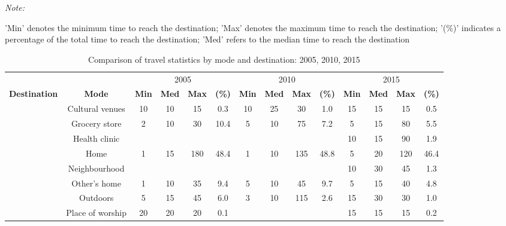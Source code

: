\documentclass[Royal,times,sageh]{sagej}
\begin{document}
\begingroup\fontsize{6}{8}\selectfont

\begin{ThreePartTable}
\begin{TableNotes}
\item \textit{Note: } 
\item 'Min' denotes the minimum time to reach the destination; 'Max' denotes the maximum time to reach the destination; '(\%)' indicates a percentage of the total time to reach the destination; 'Med' refers to the median time to reach the destination
\end{TableNotes}
\begin{longtable}[t]{ccccc>{}c|ccc>{}c|cccc}
\caption{\label{tab:table-03}\label{tab:table-03}Comparison of travel statistics by mode and destination: 2005, 2010, 2015}\\
\toprule
\multicolumn{2}{c}{ } & \multicolumn{4}{c}{2005} & \multicolumn{4}{c}{2010} & \multicolumn{4}{c}{2015} \\
\cmidrule(l{3pt}r{3pt}){3-6} \cmidrule(l{3pt}r{3pt}){7-10} \cmidrule(l{3pt}r{3pt}){11-14}
\multicolumn{1}{c}{\textbf{Destination}} & \multicolumn{1}{c}{\textbf{Mode}} & \multicolumn{1}{c}{\textbf{Min}} & \multicolumn{1}{c}{\textbf{Med}} & \multicolumn{1}{c}{\textbf{Max}} & \multicolumn{1}{c}{\textbf{(\%)}} & \multicolumn{1}{c}{\textbf{Min}} & \multicolumn{1}{c}{\textbf{Med}} & \multicolumn{1}{c}{\textbf{Max}} & \multicolumn{1}{c}{\textbf{(\%)}} & \multicolumn{1}{c}{\textbf{Min}} & \multicolumn{1}{c}{\textbf{Med}} & \multicolumn{1}{c}{\textbf{Max}} & \multicolumn{1}{c}{\textbf{(\%)}}\\
\midrule
 & Cultural venues & 10 & 10 & 15 & 0.3 & 10 & 25 & 30 & 1.0 & 15 & 15 & 15 & 0.5\\
\nopagebreak
 & Grocery store & 2 & 10 & 30 & 10.4 & 5 & 10 & 75 & 7.2 & 5 & 15 & 80 & 5.5\\
\nopagebreak
 & Health clinic &  &  &  &  &  &  &  &  & 10 & 15 & 90 & 1.9\\
\nopagebreak
 & Home & 1 & 15 & 180 & 48.4 & 1 & 10 & 135 & 48.8 & 5 & 20 & 120 & 46.4\\
\nopagebreak
 & Neighbourhood &  &  &  &  &  &  &  &  & 10 & 30 & 45 & 1.3\\
\nopagebreak
 & Other's home & 1 & 10 & 35 & 9.4 & 5 & 10 & 45 & 9.7 & 5 & 15 & 40 & 4.8\\
\nopagebreak
 & Outdoors & 5 & 15 & 45 & 6.0 & 3 & 10 & 115 & 2.6 & 15 & 30 & 30 & 1.0\\
\nopagebreak
 & Place of worship & 20 & 20 & 20 & 0.1 &  &  &  &  & 15 & 15 & 15 & 0.2\\

\end{longtable}
\end{ThreePartTable}
\end{document}
